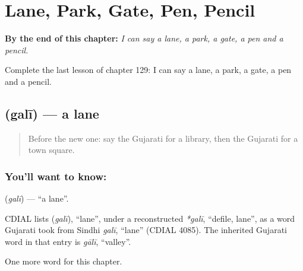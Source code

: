 
\chapter{Lane, Park, Gate, Pen, Pencil}
\label{ch:gu-lane-park-gate-pen-pencil}

\begin{chapteropening}
\textbf{By the end of this chapter:} \emph{I can say a lane, a park, a gate, a pen and a pencil.}

Complete the last lesson of chapter 129: I can say a lane, a park, a gate, a pen and a pencil.
\end{chapteropening}

\section[\texorpdfstring{\gu{ગલી} (galī)}{ગલી (galī)}]{ (galī) — a lane}

\label{lesson:GU-C129-gali}



\begin{quote}
Before the new one: say the Gujarati for a library, then the Gujarati for a town square.
\end{quote}

\subsection*{You'll want to know: }
\textbf{} (\emph{galī}) — \textquotedblleft{}a lane\textquotedblright{}.

\begin{cousinweb}
CDIAL lists \textbf{} (\emph{galī}), \textquotedblleft{}lane\textquotedblright{}, under a reconstructed \emph{*galī}, \textquotedblleft{}defile, lane\textquotedblright{}, as a word Gujarati took from Sindhi \emph{galī}, \textquotedblleft{}lane\textquotedblright{} (CDIAL 4085). The inherited Gujarati word in that entry is \emph{gālī}, \textquotedblleft{}valley\textquotedblright{}.
\end{cousinweb}

\begin{grammarlens}[title={What you've built}]
One more word for this chapter.
\end{grammarlens}

